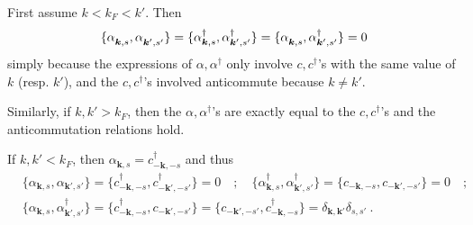 \documentclass[11pt,a4paper]{article}
\newcommand{\boldk}{{\boldsymbol k}}
\newcommand{\nodagger}{{\vphantom{\dagger}}} %
\begin{document}
%
%
%
%
%
\begin{loesung}
  \begin{exenumerate}
  \item First assume $k<k_F<k'$. Then
    \begin{align}
      \{\alpha^\nodagger_{\boldk,s}, \alpha^\nodagger_{\boldk',s'}\}
      = \{\alpha_{\boldk,s}^\dagger, \alpha_{\boldk',s'}^\dagger\}
      = \{\alpha^\nodagger_{\boldk,s}, \alpha_{\boldk',s'}^\dagger\} = 0
    \end{align}
    simply because the expressions of $\alpha, \alpha^\dagger$ only involve $c,c^\dagger$'s with the same value
    of $k$ (resp. $k'$), and the $c,c^\dagger$'s involved anticommute because $k\neq k'$.

    Similarly, if $k,k'>k_F$, then the $\alpha,\alpha^\dagger$'s are exactly equal to the $c,c^\dagger$'s and
    the anticommutation relations hold.

    If $k,k'<k_F$, then $\alpha_{\boldk,s} = c_{-\boldk,-s}^\dagger$ and thus
    \begin{align*}
      &\{\alpha_{\boldk,s}, \alpha_{\boldk',s'}\} = \{ c_{-\boldk,-s}^\dagger, c_{-\boldk',-s'}^\dagger\} = 0
      \quad;\quad
      \{\alpha_{\boldk,s}^\dagger, \alpha_{\boldk',s'}^\dagger\} = \{ c_{-\boldk,-s}, c_{-\boldk',-s'}\} = 0
      \quad;\\
      &\{\alpha_{\boldk,s}, \alpha_{\boldk',s'}^\dagger\} = \{ c_{-\boldk,-s}^\dagger, c_{-\boldk',-s'} \}
       =  \{ c_{-\boldk',-s'}, c_{-\boldk,-s}^\dagger \} = \delta_{\boldk,\boldk'}\delta_{s,s'}\ .
    \end{align*}


\end{exenumerate}
\end{loesung}
\end{document}
